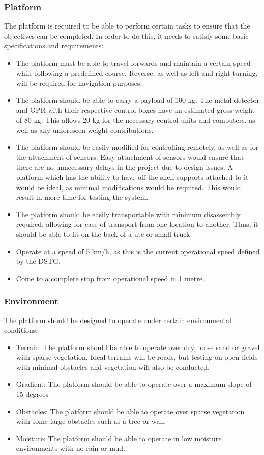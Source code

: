 \documentclass[main.tex]{subfiles}
\begin{document}
\subsubsection{Platform}
The platform is required to be able to perform certain tasks to ensure that the objectives can be completed. In order to do this, it needs to satisfy some basic specifications and requirements: 
\begin{itemize}
\item The platform must be able to travel forwards and maintain a certain speed while following a predefined course. Reverse, as well as left and right turning, will be required for navigation purposes.
 \item The platform should be able to carry a payload of 100 kg. The metal detector and GPR with their respective control boxes have an estimated gross weight of 80 kg. This allows 20 kg for the necessary control units and computers, as well as any unforeseen weight contributions. 
\item The platform should be easily modified for controlling remotely, as well as for the attachment of sensors. Easy attachment of sensors would ensure that there are no unnecessary delays in the project due to design issues. A platform which has the ability to have off the shelf supports attached to it would be ideal, as minimal modifications would be required. This would result in more time for testing the system. 
\item The platform should be easily transportable with minimum disassembly required, allowing for ease of transport from one location to another. Thus, it should be able to fit on the back of a ute or small truck.
\item Operate at a speed of 5 km/h, as this is the current operational speed defined by the DSTG.
\item Come to a complete stop from operational speed in 1 metre.
\end{itemize}
\subsubsection{Environment}

The platform should be designed to operate under certain environmental conditions:
\begin{itemize}
\item Terrain: The platform should be able to operate over dry, loose sand or gravel with sparse vegetation. Ideal terrains will be roads, but testing on open fields with minimal obstacles and vegetation will also be conducted.
\item Gradient: The platform should be able to operate over a maximum slope of 15 degrees
\item Obstacles: The platform should be able to operate over sparse vegetation with some large obstacles such as a tree or wall.
\item Moisture: The platform should be able to operate in low moisture environments with no rain or mud.
\end{itemize}
\end{document}
